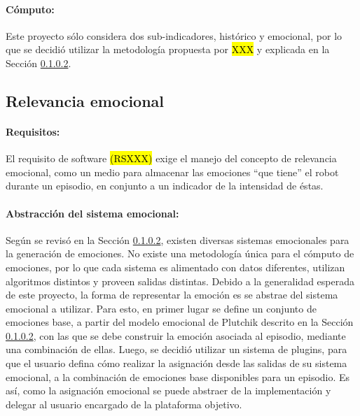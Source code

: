 \paragraph{Cómputo:}
Este proyecto sólo considera dos sub-indicadores, histórico y emocional, por lo que se decidió utilizar la metodología propuesta por \hl{XXX} \cite{} y explicada en la Sección \ref{}.


\subsection{Relevancia emocional}

\paragraph{Requisitos:}
El requisito de software \hl{(RSXXX)} exige el manejo del concepto de relevancia emocional, como un medio para almacenar las emociones ``que tiene'' el robot durante un episodio, en conjunto a un indicador de la intensidad de éstas.


\paragraph{Abstracción del sistema emocional:}
Según se revisó en la Sección \ref{}, existen diversas sistemas emocionales para la generación de emociones. No existe una metodología única para el cómputo de emociones, por lo que cada sistema es alimentado con datos diferentes, utilizan algoritmos distintos y proveen salidas distintas. Debido a la generalidad esperada de este proyecto, la forma de representar la emoción es se abstrae del sistema emocional a utilizar. Para esto, en primer lugar se define un conjunto de emociones base, a partir del modelo emocional de Plutchik descrito en la Sección \ref{}, con las que se debe construir la emoción asociada al episodio, mediante una combinación de ellas. Luego, se decidió utilizar un sistema de plugins, para que el usuario defina cómo realizar la asignación desde las salidas de su sistema emocional, a la combinación de emociones base disponibles para un episodio. Es así, como la asignación emocional se puede  abstraer de la implementación y delegar al usuario encargado de la plataforma objetivo.


